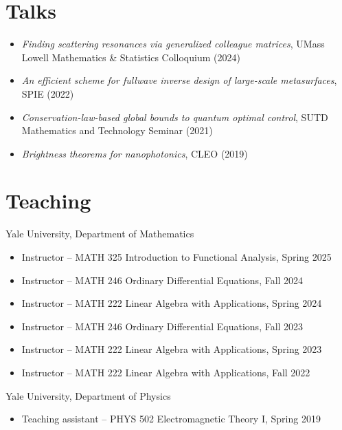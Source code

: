 \documentclass[margin,line,pifont,palatino,courier]{res}
\begin{document}
\begin{resume}
\section{\sc Talks}
\begin{itemize}
	\item \emph{Finding scattering resonances via generalized colleague matrices}, UMass Lowell Mathematics \& Statistics Colloquium (2024)
	\item \emph{An efficient scheme for fullwave inverse design of large-scale metasurfaces}, SPIE (2022)
	\item \emph{Conservation-law-based global bounds to quantum optimal control}, SUTD Mathematics and Technology Seminar (2021)
	\item \emph{Brightness theorems for nanophotonics}, CLEO (2019)
\end{itemize}

\section{\sc Teaching}
Yale University, Department of Mathematics

\begin{itemize}
\setlength\itemsep{0em}
	\item Instructor -- MATH 325 Introduction to Functional Analysis, Spring 2025
	\item Instructor -- MATH 246 Ordinary Differential Equations, Fall 2024
		\item Instructor -- MATH 222 Linear Algebra with Applications, Spring 2024
	\item Instructor -- MATH 246 Ordinary Differential Equations, Fall 2023
	\item Instructor -- MATH 222 Linear Algebra with Applications, Spring 2023
	\item Instructor -- MATH 222 Linear Algebra with Applications, Fall 2022

\end{itemize}
Yale University, Department of Physics

\begin{itemize}
\setlength\itemsep{0em}
	\item Teaching assistant -- PHYS 502 Electromagnetic Theory I, Spring 2019
\end{itemize}




\end{resume}
\end{document}
